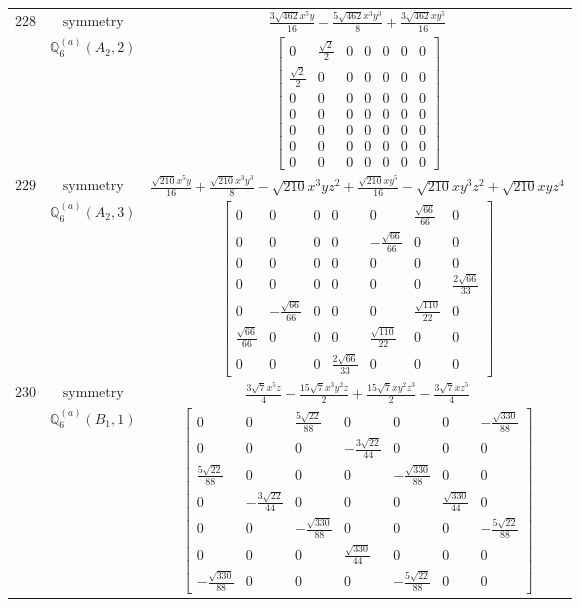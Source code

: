 \documentclass[fleqn,8pt,landscape]{jsarticle}
\begin{document}
\begin{longtable}{ccc}
$ 228 $ & $ \text{symmetry} $ & $ \frac{3 \sqrt{462} x^{5} y}{16} - \frac{5 \sqrt{462} x^{3} y^{3}}{8} + \frac{3 \sqrt{462} x y^{5}}{16} $ \\
$  $ & $ \mathbb{Q}_{6}^{(a)}(A_{2},2) $ & $ \begin{bmatrix} 0 & \frac{\sqrt{2}}{2} & 0 & 0 & 0 & 0 & 0 \\ \frac{\sqrt{2}}{2} & 0 & 0 & 0 & 0 & 0 & 0 \\ 0 & 0 & 0 & 0 & 0 & 0 & 0 \\ 0 & 0 & 0 & 0 & 0 & 0 & 0 \\ 0 & 0 & 0 & 0 & 0 & 0 & 0 \\ 0 & 0 & 0 & 0 & 0 & 0 & 0 \\ 0 & 0 & 0 & 0 & 0 & 0 & 0 \end{bmatrix} $ \\ \hline
$ 229 $ & $ \text{symmetry} $ & $ \frac{\sqrt{210} x^{5} y}{16} + \frac{\sqrt{210} x^{3} y^{3}}{8} - \sqrt{210} x^{3} y z^{2} + \frac{\sqrt{210} x y^{5}}{16} - \sqrt{210} x y^{3} z^{2} + \sqrt{210} x y z^{4} $ \\
$  $ & $ \mathbb{Q}_{6}^{(a)}(A_{2},3) $ & $ \begin{bmatrix} 0 & 0 & 0 & 0 & 0 & \frac{\sqrt{66}}{66} & 0 \\ 0 & 0 & 0 & 0 & - \frac{\sqrt{66}}{66} & 0 & 0 \\ 0 & 0 & 0 & 0 & 0 & 0 & 0 \\ 0 & 0 & 0 & 0 & 0 & 0 & \frac{2 \sqrt{66}}{33} \\ 0 & - \frac{\sqrt{66}}{66} & 0 & 0 & 0 & \frac{\sqrt{110}}{22} & 0 \\ \frac{\sqrt{66}}{66} & 0 & 0 & 0 & \frac{\sqrt{110}}{22} & 0 & 0 \\ 0 & 0 & 0 & \frac{2 \sqrt{66}}{33} & 0 & 0 & 0 \end{bmatrix} $ \\ \hline
$ 230 $ & $ \text{symmetry} $ & $ \frac{3 \sqrt{7} x^{5} z}{4} - \frac{15 \sqrt{7} x^{3} y^{2} z}{2} + \frac{15 \sqrt{7} x y^{2} z^{3}}{2} - \frac{3 \sqrt{7} x z^{5}}{4} $ \\
$  $ & $ \mathbb{Q}_{6}^{(a)}(B_{1},1) $ & $ \begin{bmatrix} 0 & 0 & \frac{5 \sqrt{22}}{88} & 0 & 0 & 0 & - \frac{\sqrt{330}}{88} \\ 0 & 0 & 0 & - \frac{3 \sqrt{22}}{44} & 0 & 0 & 0 \\ \frac{5 \sqrt{22}}{88} & 0 & 0 & 0 & - \frac{\sqrt{330}}{88} & 0 & 0 \\ 0 & - \frac{3 \sqrt{22}}{44} & 0 & 0 & 0 & \frac{\sqrt{330}}{44} & 0 \\ 0 & 0 & - \frac{\sqrt{330}}{88} & 0 & 0 & 0 & - \frac{5 \sqrt{22}}{88} \\ 0 & 0 & 0 & \frac{\sqrt{330}}{44} & 0 & 0 & 0 \\ - \frac{\sqrt{330}}{88} & 0 & 0 & 0 & - \frac{5 \sqrt{22}}{88} & 0 & 0 \end{bmatrix} $ \\ \hline

\end{longtable}
\end{document}
